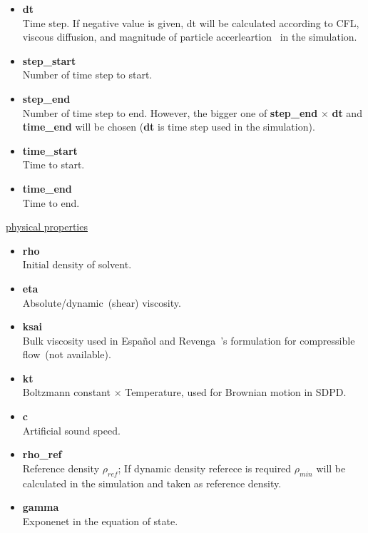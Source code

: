 \documentclass[a4paper,10pt]{article}
\begin{document}
\begin{itemize}
\item 
\textbf{dt }\\
Time step.
If negative value is given,
dt will be calculated according to
CFL,
viscous diffusion,
and magnitude of particle accerleartion~\cite{Morris1997}
in the simulation.

\item 
\textbf{step\_start} \\
Number of time step to start.

\item 
\textbf{step\_end} \\
Number of time step to end.
However,  the bigger one of
\textbf{step\_end} $\times$ \textbf{dt} and 
\textbf{time\_end} will be chosen
(\textbf{dt} is time step used in the simulation).

\item 
\textbf{time\_start} \\
Time to start.

\item 
\textbf{time\_end} \\
Time to end.

\end{itemize}

\begin{center}
\underline{\textlangle physical properties \textrangle}
\end{center}

\begin{itemize}
 
\item 
\textbf{rho} \\
Initial density of solvent.

\item 
\textbf{eta} \\
Absolute/dynamic~(shear) viscosity.

\item 
\textbf{ksai} \\
Bulk viscosity used in 
Espa\~{n}ol and Revenga~\cite{Espanol2003}'s
formulation for compressible flow~(not available).

\item 
\textbf{kt}   \\
Boltzmann constant $\times$ Temperature,
used for Brownian motion in SDPD.

\item 
\textbf{c}  \\
Artificial sound speed.  

\item 
\textbf{rho\_ref} \\
Reference density \textbf{$\rho_{ref}$}; 
If dynamic density referece is required
\textbf{$\rho_{min}$} will be calculated 
in the simulation and
taken as reference density.

\item 
\textbf{gamma}  \\
Exponenet in the equation of state.

\end{itemize}
\end{document}
